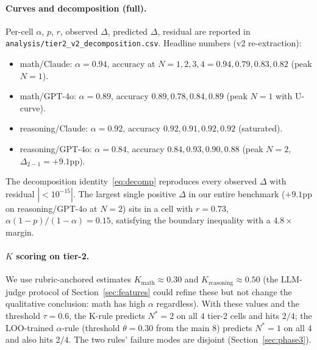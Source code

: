 \documentclass{article}
\begin{document}
\paragraph{Curves and decomposition (full).}
Per-cell $\alpha$, $p$, $r$, observed $\Delta$, predicted $\Delta$, residual
are reported in \texttt{analysis/tier2\_v2\_decomposition.csv}.
Headline numbers (v2 re-extraction):
\begin{itemize}
\item math/Claude: $\alpha{=}0.94$, accuracy at $N{=}1{,}2{,}3{,}4 = 0.94, 0.79, 0.83, 0.82$ (peak $N{=}1$).
\item math/GPT-4o: $\alpha{=}0.89$, accuracy $0.89, 0.78, 0.84, 0.89$ (peak $N{=}1$ with U-curve).
\item reasoning/Claude: $\alpha{=}0.92$, accuracy $0.92, 0.91, 0.92, 0.92$ (saturated).
\item reasoning/GPT-4o: $\alpha{=}0.84$, accuracy $0.84, 0.93, 0.90, 0.88$ (peak $N{=}2$, $\Delta_{2-1}{=}{+}9.1$pp).
\end{itemize}
The decomposition identity~\eqref{eq:decomp} reproduces every observed
$\Delta$ with residual $|{<}10^{-15}|$. The largest single positive $\Delta$
in our entire benchmark ($+9.1$pp on reasoning/GPT-4o at $N{=}2$) sits in a
cell with $r{=}0.73$, $\alpha(1{-}p)/(1{-}\alpha){=}0.15$, satisfying the
boundary inequality with a $4.8{\times}$ margin.

\paragraph{$K$ scoring on tier-2.} We use rubric-anchored estimates
$K_{\text{math}}{\approx}0.30$ and $K_{\text{reasoning}}{\approx}0.50$ (the
LLM-judge protocol of Section~\ref{sec:features} could refine these but not
change the qualitative conclusion: math has high $\alpha$ regardless). With
these values and the threshold $\tau{=}0.6$, the K-rule predicts
$N^{*}{=}2$ on all $4$ tier-2 cells and hits $2/4$; the LOO-trained
$\alpha$-rule (threshold $\theta{=}0.30$ from the main 8) predicts
$N^{*}{=}1$ on all $4$ and also hits $2/4$. The two rules' failure modes
are disjoint (Section~\ref{sec:phase3}).



\end{document}
